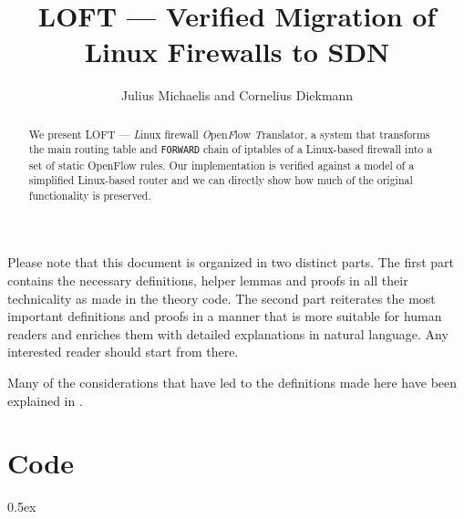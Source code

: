 \documentclass[a4paper]{article}
\begin{document}
\title{LOFT --- Verified Migration of Linux Firewalls to SDN}
\author{Julius Michaelis and Cornelius Diekmann}
\maketitle

\begin{abstract}
	We present LOFT --- \emph{L}inux firewall \emph{O}pen\emph{F}low \emph{T}ranslator, a system that transforms the main routing table and \texttt{FORWARD} chain of iptables of a Linux-based firewall into a set of static OpenFlow rules.
	Our implementation is verified against a model of a simplified Linux-based router and we can directly show how much of the original functionality is preserved.
\end{abstract}
\vspace{1em}

Please note that this document is organized in two distinct parts.
The first part contains the necessary definitions, helper lemmas and proofs in all their technicality as made in the theory code.
The second part reiterates the most important definitions and proofs in a manner that is more suitable for human readers and enriches them with detailed explanations in natural language.
Any interested reader should start from there.

Many of the considerations that have led to the definitions made here have been explained in \cite{michaelis2016middlebox}.

\tableofcontents

\newpage

\part{Code}

\parindent 0pt\parskip 0.5ex








%
%
\end{document}
